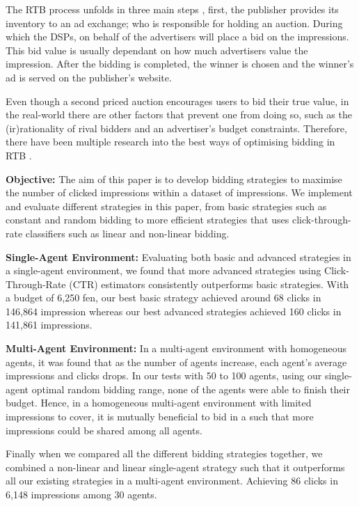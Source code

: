 \documentclass{sig-alternate-05-2015}
\begin{document}
The RTB process unfolds in three main steps \cite{yuan_meas_2013}, first, the publisher provides its inventory to an ad exchange; who is responsible for holding an auction. During which the DSPs, on behalf of the advertisers will place a bid on the impressions. This bid value is usually dependant on how much advertisers value the impression. After the bidding is completed, the winner is chosen and the winner's ad is served on the publisher's website. 

Even though a second priced auction encourages users to bid their true value, in the real-world there are other factors that prevent one from doing so, such as the (ir)rationality of rival bidders and an advertiser's budget constraints. Therefore, there have been multiple research into the best ways of optimising bidding in RTB \cite{yuan_rev_2014, zhang_real-time_2014}.

\textbf{Objective:}
The aim of this paper is to develop bidding strategies to maximise the number of clicked impressions within a dataset of impressions. We implement and evaluate different strategies in this paper, from basic strategies such as constant and random bidding to more efficient strategies that uses click-through-rate classifiers such as linear and non-linear bidding.

\textbf{Single-Agent Environment:}
Evaluating both basic and advanced strategies in a single-agent environment, we found that more advanced strategies using Click-Through-Rate (CTR) estimators consistently outperforms basic strategies. With a budget of 6,250 fen, our best basic strategy achieved around 68 clicks in 146,864 impression whereas our best advanced strategies achieved 160 clicks in 141,861 impressions.

\textbf{Multi-Agent Environment:}
In a multi-agent environment with homogeneous agents, it was found that as the number of agents increase, each agent's average impressions and clicks drops. In our tests with 50 to 100 agents, using our single-agent optimal random bidding range, none of the agents were able to finish their budget. Hence, in a homogeneous multi-agent environment with limited impressions to cover, it is mutually beneficial to bid in a such that more impressions could be shared among all agents. 

Finally when we compared all the different bidding strategies together, we combined a non-linear and linear single-agent strategy such that it outperforms all our existing strategies in a multi-agent environment. Achieving 86 clicks in 6,148 impressions among 30 agents. 
\end{document}
